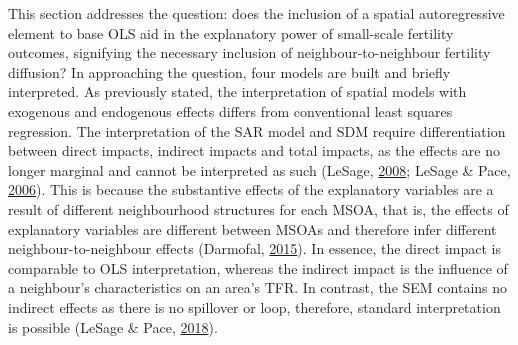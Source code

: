 \documentclass[12pt,twoside]{reedthesis}
\begin{document}
This section addresses the question: does the inclusion of a spatial autoregressive element to base OLS aid in the explanatory power of small-scale fertility outcomes, signifying the necessary inclusion of neighbour-to-neighbour fertility diffusion? In approaching the question, four models are built and briefly interpreted. As previously stated, the interpretation of spatial models with exogenous and endogenous effects differs from conventional least squares regression. The interpretation of the SAR model and SDM require differentiation between direct impacts, indirect impacts and total impacts, as the effects are no longer marginal and cannot be interpreted as such (LeSage, \protect\hyperlink{ref-lesage2008}{2008}; LeSage \& Pace, \protect\hyperlink{ref-lesage2006}{2006}). This is because the substantive effects of the explanatory variables are a result of different neighbourhood structures for each MSOA, that is, the effects of explanatory variables are different between MSOAs and therefore infer different neighbour-to-neighbour effects (Darmofal, \protect\hyperlink{ref-darmofal2015}{2015}). In essence, the direct impact is comparable to OLS interpretation, whereas the indirect impact is the influence of a neighbour's characteristics on an area's TFR. In contrast, the SEM contains no indirect effects as there is no spillover or loop, therefore, standard interpretation is possible (LeSage \& Pace, \protect\hyperlink{ref-lesage2018}{2018}).
\end{document}
